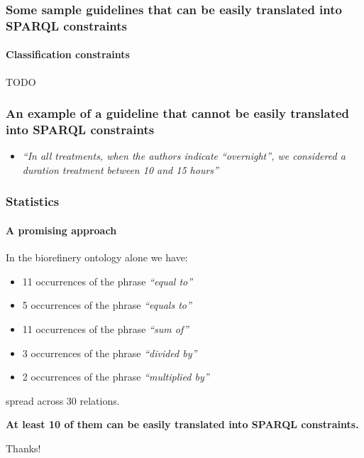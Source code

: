 \documentclass{beamer}
\begin{document}
\begin{frame}
  \frametitle{Some sample guidelines that can be easily translated into SPARQL
  constraints}
  \framesubtitle{Classification constraints}

  TODO
\end{frame}

\begin{frame}
  \frametitle{An example of a guideline that \textbf{cannot} be easily
  translated into SPARQL constraints}

  \begin{itemize}
    \item \textit{``In all treatments, when the authors indicate ``overnight'',
      we considered a duration treatment between 10 and 15 hours''}
  \end{itemize}
\end{frame}

\begin{frame}
  \frametitle{Statistics}
  \framesubtitle{A promising approach}

  In the biorefinery ontology alone we have:

  \begin{itemize}
    \item 11 occurrences of the phrase \textit{``equal to''}
    \item 5 occurrences of the phrase \textit{``equals to''}
    \item 11 occurrences of the phrase \textit{``sum of''}
    \item 3 occurrences of the phrase \textit{``divided by''}
    \item 2 occurrences of the phrase \textit{``multiplied by''}
  \end{itemize}

  spread across 30 relations.

  \vspace{1em}

  \textbf{At least 10 of them can be easily translated into SPARQL constraints.}
\end{frame}

\begin{frame}
  \begin{center}
    \Huge{Thanks!}
  \end{center}
\end{frame}
\end{document}
